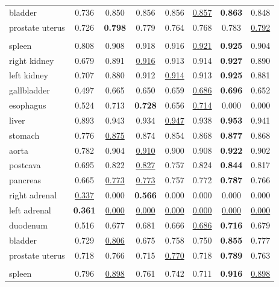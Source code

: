 \begin{minipage}{\textwidth}
{\begin{tabular}{@{}lccccccc@{}}
bladder & 0.736 & 0.850 & 0.856 & 0.856 & \underline{0.857} & \textbf{0.863} & 0.848 \\
prostate uterus & 0.726 & \textbf{0.798} & 0.779 & 0.764 & 0.768 & 0.783 & \underline{0.792} \\
\addlinespace
\multicolumn{8}{@{}l}{\textit{joint}} \\
spleen & 0.808 & 0.908 & 0.918 & 0.916 & \underline{0.921} & \textbf{0.925} & 0.904 \\
right kidney & 0.679 & 0.891 & \underline{0.916} & 0.913 & 0.914 & \textbf{0.927} & 0.890 \\
left kidney & 0.707 & 0.880 & 0.912 & \underline{0.914} & 0.913 & \textbf{0.925} & 0.881 \\
gallbladder & 0.497 & 0.665 & 0.650 & 0.659 & \underline{0.686} & \textbf{0.696} & 0.652 \\
esophagus & 0.524 & 0.713 & \textbf{0.728} & 0.656 & \underline{0.714} & 0.000 & 0.000 \\
liver & 0.893 & 0.943 & 0.934 & \underline{0.947} & 0.938 & \textbf{0.953} & 0.941 \\
stomach & 0.776 & \underline{0.875} & 0.874 & 0.854 & 0.868 & \textbf{0.877} & 0.868 \\
aorta & 0.782 & 0.904 & \underline{0.910} & 0.900 & 0.908 & \textbf{0.922} & 0.902 \\
postcava & 0.695 & 0.822 & \underline{0.827} & 0.757 & 0.824 & \textbf{0.844} & 0.817 \\
pancreas & 0.665 & \underline{0.773} & \underline{0.773} & 0.757 & 0.772 & \textbf{0.787} & 0.766 \\
right adrenal & \underline{0.337} & 0.000 & \textbf{0.566} & 0.000 & 0.000 & 0.000 & 0.000 \\
left adrenal & \textbf{0.361} & \underline{0.000} & \underline{0.000} & \underline{0.000} & \underline{0.000} & \underline{0.000} & \underline{0.000} \\
duodenum & 0.516 & 0.677 & 0.681 & 0.666 & \underline{0.686} & \textbf{0.716} & 0.679 \\
bladder & 0.729 & \underline{0.806} & 0.675 & 0.758 & 0.750 & \textbf{0.855} & 0.777 \\
prostate uterus & 0.718 & 0.766 & 0.715 & \underline{0.770} & 0.718 & \textbf{0.789} & 0.763 \\
\addlinespace
\multicolumn{8}{@{}l}{\textit{joint (8000 steps)}} \\
spleen & 0.796 & \underline{0.898} & 0.761 & 0.742 & 0.711 & \textbf{0.916} & \underline{0.898} \\

\end{tabular}}
\end{minipage}
